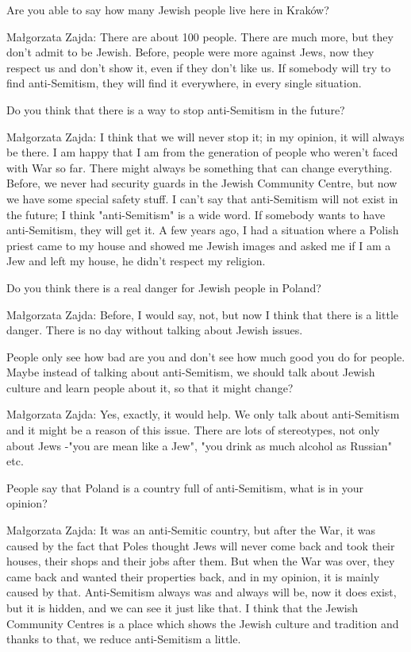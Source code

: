 Are you able to say how many Jewish people live here in Kraków? 

Małgorzata Zajda:  There are about 100 people. There are much more, but they don't admit to be Jewish. 
Before, people were more against Jews, now they respect us and don't show it, even if they don't like us. If somebody will try to find anti-Semitism, they will find it everywhere, in every single situation. 

Do you think that there is a way to stop anti-Semitism in the future? 

Małgorzata Zajda:  I think that we will never stop it; in my opinion, it will always be there. I am happy that I am from the generation of people who weren’t faced with War so far. There might always be something that can change everything. Before, we never had security guards in the Jewish Community Centre, but now we have some special safety stuff. I can't say that anti-Semitism will not exist in the future; I think "anti-Semitism" is a wide word. If somebody wants to have anti-Semitism, they will get it.  
A few years ago, I had a situation where a Polish priest came to my house and showed me Jewish images and asked me if I am a Jew and left my house, he didn't respect my religion.  

Do you think there is a real danger for Jewish people in Poland?  

Małgorzata Zajda:  Before, I would say, not, but now I think that there is a little danger. There is no day without talking about Jewish issues.  

 People only see how bad are you and don't see how much good you do for people. Maybe instead of talking about anti-Semitism, we should talk about Jewish culture and learn people about it, so that it might change? 

Małgorzata Zajda:  Yes, exactly, it would help. We only talk about anti-Semitism and it might be a reason of this issue.  
There are lots of stereotypes, not only about Jews -"you are mean like a Jew", "you drink as much alcohol as Russian" etc.  

People say that Poland is a country full of anti-Semitism, what is in your opinion? 

Małgorzata Zajda:  It was an anti-Semitic country, but after the War, it was caused by the fact that Poles thought Jews will never come back and took their houses, their shops and their jobs after them. But when the War was over, they came back and wanted their properties back, and in my opinion, it is mainly caused by that. Anti-Semitism always was and always will be, now it does exist, but it is hidden, and we can see it just like that.  
I think that the Jewish Community Centres is a place which shows the Jewish culture and tradition and thanks to that, we reduce anti-Semitism a little.  

